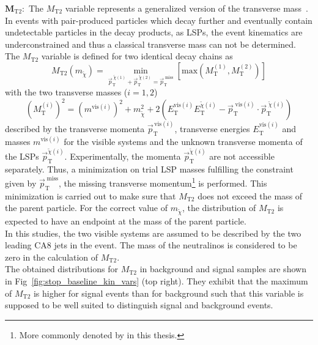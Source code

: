 \begin{description}
 \item $\mathbf{M_\mathrm{T2}:}$ The $M_\mathrm{T2}$ variable represents a generalized version of the transverse mass~\cite{Lester:1999tx, Barr:2003rg, Chatrchyan:2012jx, CMS-PAS-SUS-13-019}. In events with pair-produced particles which decay further and eventually contain undetectable particles in the decay products, as \eg LSPs, the event kinematics are underconstrained and thus a classical transverse mass can not be determined. The $M_\mathrm{T2}$ variable is defined for two identical decay chains as
\begin{equation}
 M_\mathrm{T2}(m_{\tilde{\chi}}) = \min_{\vec{p}_\mathrm{T}^{\;\tilde{\chi}(1)} + \vec{p}_\mathrm{T}^{\;\tilde{\chi}(2)} = \vec{p}_\mathrm{T}^{\; \mathrm{miss}}} \left[ \mathrm{max} \left(M_\mathrm{T}^{(1)}, M_\mathrm{T}^{(2)} \right) \right] 
\end{equation} 
with the two transverse masses ($i = 1, 2$)
\begin{equation}
 (M_\mathrm{T}^{(i)})^2 = (m^{\mathrm{vis}(i)})^2 + m_{\tilde{\chi}}^2 + 2 \left( E_\mathrm{T}^{\mathrm{vis}(i)} E_\mathrm{T}^{\tilde{\chi}(i)} - \vec{p}_\mathrm{T}^{\; \mathrm{vis}(i)} \cdot \vec{p}_\mathrm{T}^{\; \tilde{\chi}(i)}   \right) 
\end{equation}
described by the transverse momenta $\vec{p}_\mathrm{T}^{\, \mathrm{vis}(i)}$, transverse energies $E_\mathrm{T}^{\mathrm{vis}(i)}$ and masses $m^{\mathrm{vis}(i)}$ for the visible systems and the unknown transverse momenta of the LSPs $\vec{p}_\mathrm{T}^{\tilde{\chi}(i)} $. Experimentally, the momenta $\vec{p}_\mathrm{T}^{\tilde{\chi}(i)}$ are not accessible separately. Thus, a minimization on trial LSP masses fulfilling the constraint given by $\vec{p}_\mathrm{T}^{\; \mathrm{miss}}$, the missing transverse momentum\footnote{More commonly denoted by \metvec in this thesis.} is performed. This minimization is carried out to make sure that $M_\mathrm{T2}$ does not exceed the mass of the parent particle. For the correct value of $m_{\tilde{\chi}}$, the distribution of $M_\mathrm{T2}$ is expected to have an endpoint at the mass of the parent particle. \\
In this studies, the two visible systems are assumed to be described by the two leading CA8 jets in the event. The mass of the neutralinos is considered to be zero in the calculation of $M_\mathrm{T2}$. \\ 
The obtained distributions for $M_\mathrm{T2}$ in background and signal samples are shown in Fig~\ref{fig:stop_baseline_kin_vars} (top right). They exhibit that the maximum of $M_\mathrm{T2}$ is higher for signal events than for background such that this variable is supposed to be well suited to distinguish signal and background events.  

\end{description}

